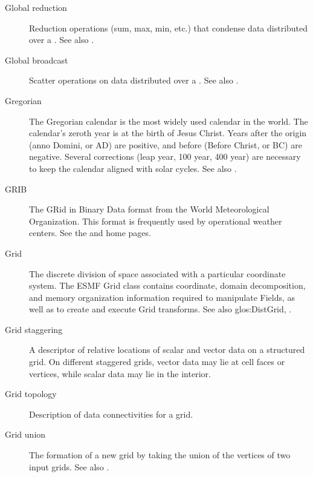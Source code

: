 \begin{description}
\label{glos:GlobReduction} 
\item[Global reduction] 
  Reduction operations (sum, max, min, etc.) that condense data distributed
  over a .
  See also .

\label{glos:GlobBroadcast}
\item[Global broadcast] 
  Scatter operations on data distributed over a 
  .
  See also .

\label{glos:Gregorian calendar}
\item[Gregorian]
  The Gregorian calendar is the most widely used calendar
in the world.  The calendar's zeroth year is at the
birth of Jesus Christ.  Years after the origin (anno Domini,
or AD) are positive, and before (Before Christ, or BC) are
negative.  Several corrections (leap year, 100 year, 400 year) 
are necessary to keep the calendar aligned with solar cycles.
  See also .

\label{glos:GRIB}
\item[GRIB]
  The GRid in Binary Data format from the World Meteorological Organization.
This format is frequently used by operational weather centers.  See the
 and
 home pages.

\label{glos:Grid} 
\item[Grid] 
  The discrete division of space associated with
  a particular coordinate system.  The ESMF Grid class contains 
  coordinate, domain decomposition, and memory 
  organization information required to manipulate 
  Fields, as well as to create and execute Grid transforms. 
  See also 
  {glos:DistGrid}, .

\label{glos:GridStagger} 
\item[Grid staggering] 
  A descriptor of relative locations
  of scalar and vector data on a structured grid. On different
  staggered grids, vector data may lie at cell faces or vertices,
  while scalar data may lie in the interior. 

\label{glos:GridTopo} 
\item[Grid topology] 
  Description of data connectivities for a grid.

\label{glos:GridUnion} 
\item[Grid union] 
  The formation of a new grid
  by taking the union of the vertices of two input grids.
  See also . 


\end{description}
